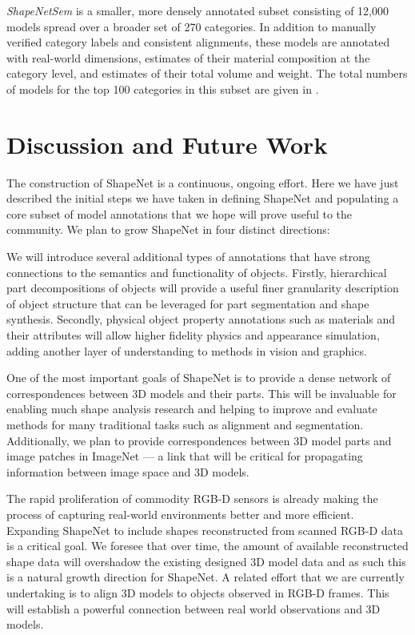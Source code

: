 \emph{ShapeNetSem} is a smaller, more densely annotated subset consisting of 12,000 models spread over a broader set of 270 categories.  In addition to manually verified category labels and consistent alignments, these models are annotated with real-world dimensions, estimates of their material composition at the category level, and estimates of their total volume and weight.  The total numbers of models for the top 100 categories in this subset are given in .

\section{Discussion and Future Work}
\label{sec:discussion}
The construction of ShapeNet is a continuous, ongoing effort.  Here we have just described the initial steps we have taken in defining ShapeNet and populating a core subset of model annotations that we hope will prove useful to the community.  We plan to grow ShapeNet in four distinct directions:

 We will introduce several additional types of annotations that have strong connections to the semantics and functionality of objects. Firstly, hierarchical part decompositions of objects will provide a useful finer granularity description of object structure that can be leveraged for part segmentation and shape synthesis. Secondly, physical object property annotations such as materials and their attributes will allow higher fidelity physics and appearance simulation, adding another layer of understanding to methods in vision and graphics.

 One of the most important goals of ShapeNet is to provide a dense network of correspondences between 3D models and their parts.  This will be invaluable for enabling much shape analysis research and helping to improve and evaluate methods for many traditional tasks such as alignment and segmentation.  Additionally, we plan to provide correspondences between 3D model parts and image patches in ImageNet --- a link that will be critical for propagating information between image space and 3D models.

 The rapid proliferation of commodity \mbox{RGB-D} sensors is already making the process of capturing real-world environments better and more efficient.  Expanding ShapeNet to include shapes reconstructed from scanned \mbox{RGB-D} data is a critical goal.  We foresee that over time, the amount of available reconstructed shape data will overshadow the existing designed 3D model data and as such this is a natural growth direction for ShapeNet.  A related effort that we are currently undertaking is to align 3D models to objects observed in RGB-D frames.  This will establish a powerful connection between real world observations and 3D models.

